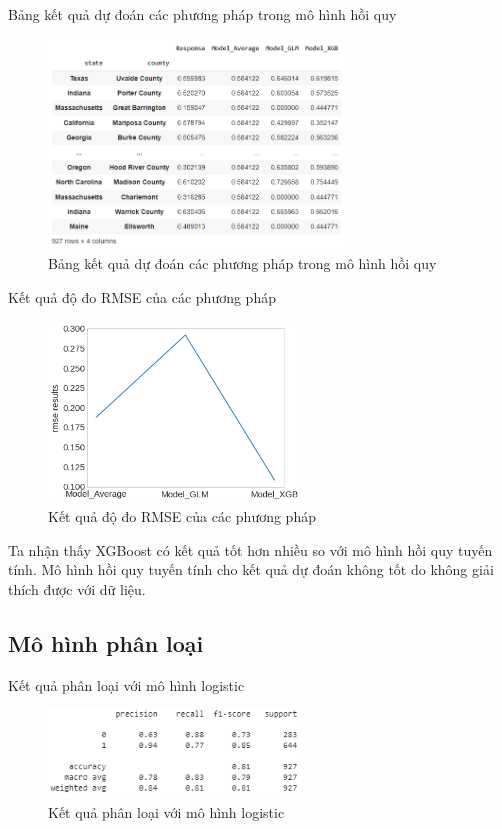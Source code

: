 \documentclass[10pt]{beamer}
\theoremstyle{remark}
\theoremstyle{definition}
\begin{document}
\begin{frame}{Bảng kết quả dự đoán các phương pháp trong mô hình hồi quy}
	\begin{figure}[h!]
        \centering
        \includegraphics[width=0.7\textwidth]{figures/Regression_Model_Result.png}
        \caption{Bảng kết quả dự đoán các phương pháp trong mô hình hồi quy}
    \end{figure}
\end{frame}

\begin{frame}{Kết quả độ đo RMSE của các phương pháp}
	\begin{figure}[h!]
        \centering
        \includegraphics[width=0.6\textwidth]{figures/Regression_Model_Result_RMSE.png}
        \caption{Kết quả độ đo RMSE của các phương pháp}
    \end{figure}
	Ta nhận thấy XGBoost có kết quả tốt hơn nhiều so với mô hình hồi quy tuyến tính.
    Mô hình hồi quy tuyến tính cho kết quả dự đoán không tốt do không giải thích được với dữ liệu.
\end{frame}

\subsection{Mô hình phân loại}

\begin{frame}{Kết quả phân loại với mô hình logistic}
	\begin{figure}[h!]
        \centering
        \includegraphics[width=0.6\textwidth]{figures/Logistic_Regression_Report.png}
        \caption{Kết quả phân loại với mô hình logistic}
    \end{figure}
\end{frame}
\end{document}

